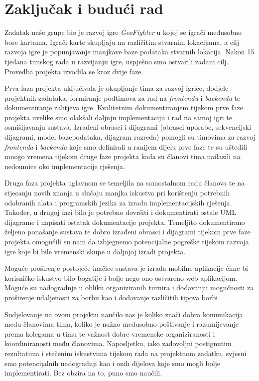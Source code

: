 \chapter{Zaključak i budući rad}
		
		{Zadatak naše grupe bio je razvoj igre \textit{GeoFighter} u kojoj se igrači međusobno bore kartama. Igrači karte skupljaju na različitim stvarnim lokacijama, a cilj razvoja igre je popunjavanje manjkave baze podataka stvarnih lokacija. Nakon 15 tjedana timskog rada u razvijanju igre, uspješno smo ostvarili zadani cilj. Provedba projekta izvodila se kroz dvije faze.} 
		
		{Prva faza projekta uključivala je okupljanje tima za razvoj igrice, dodjele projektnih zadataka, formiranje podtimova za rad na \textit{frontendu} i \textit{backendu} te dokumentiranje zahtjeva igre. Kvalitetnim dokumentiranjem tijekom prve faze projekta uvelike smo olakšali daljnju implementaciju i rad na samoj igri te osmišljavanju sustava. Izrađeni obrasci i dijagrami (obrasci uporabe, sekvencijski dijagrami, model bazepodataka, dijagram razreda) pomogli su timovima za razvoj \textit{frontenda} i \textit{backenda} koje smo definirali u ranijem dijelu prve faze te su uštedili mnogo vremena tijekom druge faze projekta kada su članovi tima nailazili na nedoumice oko implementacije rješenja.}
			
		{Druga faza projekta uglavnom se temeljila na samostalnom radu članova te na stjecanju novih znanja u slučaju manjka iskustva pri korištenju potrebnih odabranih alata i programskih jezika za izradu implementacijskih rješenja. Također, u drugoj fazi bilo je potrebno dovršiti i dokumentirati ostale UML dijagrame i napisati ostatak dokumentacije projekta. Temeljito dokumentirano željeno ponašanje sustava te dobro izrađeni obrasci i dijagrami tijekom prve faze projekta omogućili su nam da izbjegnemo potencijalne pogreške tijekom razvoja igre koje bi bile vremenski skupe u daljnjoj izradi projekta.}
		
		{Moguće proširenje postojeće inačice sustava je izrada mobilne aplikacije čime bi korisničko iskustvo bilo bogatije i bolje nego ono ostvareno web aplikacijom. Moguće su nadogradnje u obliku organiziranih turnira i dodavanju mogućnosti za proširenje udaljenosti za borbu kao i dodavanje različitih tipova borbi.}
		
		{Sudjelovanje na ovom projektu naučilo nas je koliko znači dobra komunikacija među članovima tima, koliko je nužno međusobno poštivanje i razumijevanje prema kolegama u timu te važnost dobre vremenske organiziranosti i koordiniranosti među članovima. Naposljetku, iako zadovoljni postignutim rezultatima i stečenim iskustvima tijekom rada na projektnom zadatku, svjesni smo potencijalnih nadogradnji kao i onih dijelova koje smo mogli bolje implementirati. Bez obzira na to, puno smo naučili.}\textsc{}
		
		\eject 